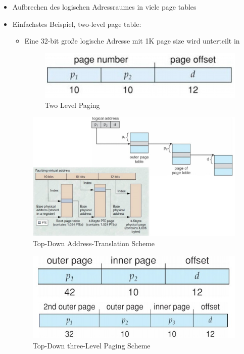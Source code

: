 \documentclass[a4paper]{scrreprt}
\begin{document}
\begin{itemize}
\item Aufbrechen des logischen Adressraumes in viele page tables
\item Einfachstes Beispiel, two-level page table:
\begin{itemize}
\item Eine 32-bit große logische Adresse mit 1K page size wird unterteilt in
\begin{figure}[ht]
\centering
\includegraphics[scale=0.3]{graphics/twolevelpage.png}
\caption{Two Level Paging}
\end{figure}

\end{itemize}

\begin{figure}[ht]
\centering
\includegraphics[scale=0.4]{graphics/topdownadress.png}
\caption{Top-Down Address-Translation Scheme}
\end{figure}

\begin{figure}[ht]
\centering
\includegraphics[scale=0.3]{graphics/topdownthreelevel.png}
\caption{Top-Down three-Level Paging Scheme}
\end{figure}

\end{itemize}
\end{document}
